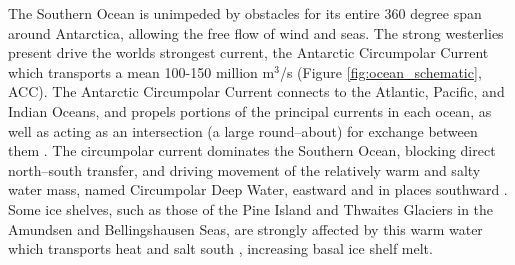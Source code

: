 The Southern Ocean is unimpeded by obstacles for its entire 360 degree span around Antarctica, allowing the free flow of wind and seas. The strong westerlies present drive the worlds strongest current, the Antarctic Circumpolar Current which transports a mean 100-150 million $\mathrm{m}^3$/s \citep{knauss2016introduction} (Figure \ref{fig:ocean_schematic}, ACC). The Antarctic Circumpolar Current connects to the Atlantic, Pacific, and Indian Oceans, and propels portions of the principal currents in each ocean, as well as acting as an intersection (a large round--about) for exchange between them \citep{knauss2016introduction}. The circumpolar current dominates the Southern Ocean, blocking direct north--south transfer, and driving movement of the relatively warm and salty water mass, named Circumpolar Deep Water, eastward and in places southward \citep{knauss2016introduction}. Some ice shelves, such as those of the Pine Island and Thwaites Glaciers \citep{nakayama2019pathways} in the Amundsen and Bellingshausen Seas,  are strongly affected by this warm water which transports heat and salt south \citep{nakayama2018origin}, increasing basal ice shelf melt. 

